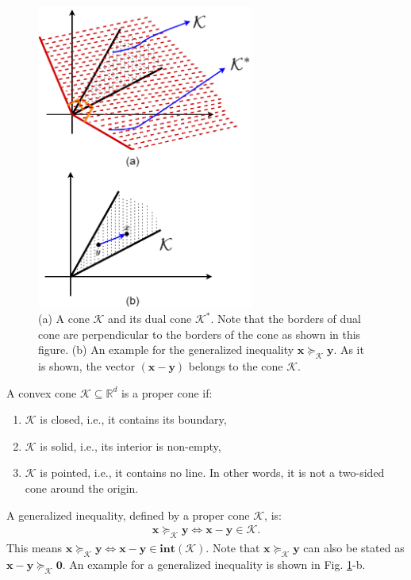 \documentclass[lang=cn,10pt]{gorgeousnbook}
\numberwithin{equation}{section}%
\numberwithin{figure}{section}%
\begin{document}
\begin{figure}[!t]
\centering
\includegraphics[width=2.8in]{./images/dual_cone}
\caption{(a) A cone $\mathcal{K}$ and its dual cone $\mathcal{K}^*$. Note that the borders of dual cone are perpendicular to the borders of the cone as shown in this figure. (b) An example for the generalized inequality $\boldsymbol{x} \succeq_\mathcal{K} \boldsymbol{y}$. As it is shown, the vector $(\boldsymbol{x} - \boldsymbol{y})$ belongs to the cone $\mathcal{K}$.}
\label{figure_dual_cone}
\end{figure}

\begin{definition}
A convex cone $\mathcal{K} \subseteq \mathbb{R}^d$ is a proper cone if:
\begin{enumerate}
\item $\mathcal{K}$ is closed, i.e., it contains its boundary, 
\item $\mathcal{K}$ is solid, i.e., its interior is non-empty, 
\item $\mathcal{K}$ is pointed, i.e., it contains no line. In other words, it is not a two-sided cone around the origin.
\end{enumerate}
\end{definition}

\begin{definition}\label{definition_generalized_inequality}
A generalized inequality, defined by a proper cone $\mathcal{K}$, is:
\begin{align*}
\boldsymbol{x} \succeq_\mathcal{K} \boldsymbol{y} \iff \boldsymbol{x} - \boldsymbol{y} \in \mathcal{K}.
\end{align*}
This means $\boldsymbol{x} \succeq_\mathcal{K} \boldsymbol{y} \iff \boldsymbol{x} - \boldsymbol{y} \in \textbf{int}(\mathcal{K})$. 
Note that $\boldsymbol{x} \succeq_\mathcal{K} \boldsymbol{y}$ can also be stated as $\boldsymbol{x} - \boldsymbol{y} \succeq_\mathcal{K} \boldsymbol{0}$.
An example for a generalized inequality is shown in Fig. \ref{figure_dual_cone}-b.
\end{definition}
\end{document}
